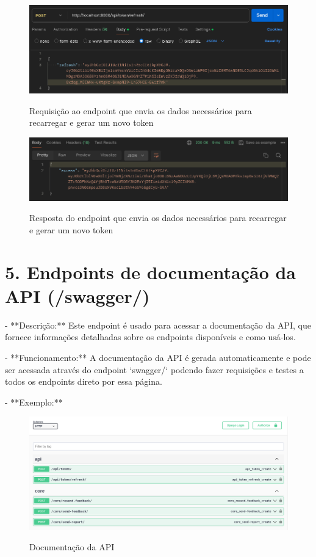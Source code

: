 \begin{figure}[H]
    \centering
    \caption{Requisição ao endpoint que envia os dados necessários para recarregar e gerar um novo token}
    \includegraphics[width=1\textwidth]{figuras/refresh.png}
    \label{fig:report_questions}
\end{figure}

\begin{figure}[H]
    \centering
    \caption{Resposta do endpoint que envia os dados necessários para recarregar e gerar um novo token}
    \includegraphics[width=1\textwidth]{figuras/refresh_result.png}
    \label{fig:report_questions}
\end{figure}

\section*{5. Endpoints de documentação da API (/swagger/)}

- **Descrição:** Este endpoint é usado para acessar a documentação da API, que fornece informações detalhadas sobre os endpoints disponíveis e como usá-los.

- **Funcionamento:** A documentação da API é gerada automaticamente e pode ser acessada através do endpoint `swagger/` podendo fazer requisições e testes a todos os endpoints direto por essa página.

- **Exemplo:**

\begin{figure}[H]
    \centering
    \caption{Documentação da API}
    \includegraphics[width=1\textwidth]{figuras/swagger.png}
    \label{fig:report_questions}
\end{figure}

